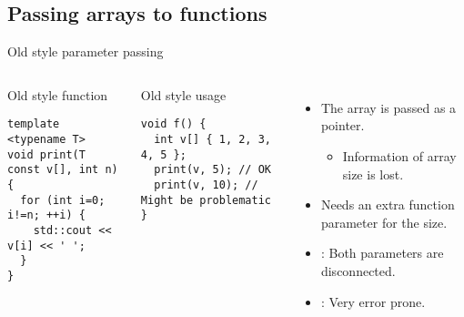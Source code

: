 \subsection{Passing arrays to functions}

\begin{frame}[t,fragile]{Old style parameter passing}
\begin{columns}[T]

\begin{block}{Old style function}
\begin{lstlisting}
template <typename T>
void print(T const v[], int n) {
  for (int i=0; i!=n; ++i) {
    std::cout << v[i] << ' ';
  }
}
\end{lstlisting}
\end{block}

\begin{block}{Old style usage}
\begin{lstlisting}
void f() {
  int v[] { 1, 2, 3, 4, 5 };
  print(v, 5); // OK
  print(v, 10); // Might be problematic
}
\end{lstlisting}
\end{block}

\begin{itemize}
  \item The array is passed as a pointer.
    \begin{itemize}
      \item Information of array size is lost.
    \end{itemize}

  \item Needs an extra function parameter for the size.

  \item {}: Both parameters are disconnected.

  \item {}: Very error prone.
\end{itemize}

\end{columns}
\end{frame}

